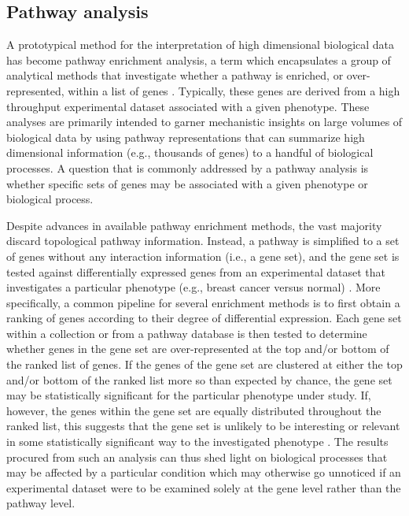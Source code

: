 \subsection{Pathway analysis}

A prototypical method for the interpretation of high dimensional biological data has become pathway enrichment analysis, a term which encapsulates a group of analytical methods that investigate whether a pathway is enriched, or over-represented, within a list of genes \parencite{reimand2019}. Typically, these genes are derived from a high throughput experimental dataset associated with a given phenotype. These analyses are primarily intended to garner mechanistic insights on large volumes of biological data by using pathway representations that can summarize high dimensional information (e.g., thousands of genes) to a handful of biological processes. A question that is commonly addressed by a pathway analysis is whether specific sets of genes may be associated with a given phenotype or biological process. 

Despite advances in available pathway enrichment methods, the vast majority discard topological pathway information. Instead, a pathway is simplified to a set of genes without any interaction information (i.e., a gene set), and the gene set is tested against differentially expressed genes from an experimental dataset that investigates a particular phenotype (e.g., breast cancer versus normal) \parencite{maleki2020}. More specifically, a common pipeline for several enrichment methods is to first obtain a ranking of genes according to their degree of differential expression. Each gene set within a collection or from a pathway database is then tested to determine whether genes in the gene set are over-represented at the top and/or bottom of the ranked list of genes. If the genes of the gene set are clustered at either the top and/or bottom of the ranked list more so than expected by chance, the gene set may be statistically significant for the particular phenotype under study. If, however, the genes within the gene set are equally distributed throughout the ranked list, this suggests that the gene set is unlikely to be interesting or relevant in some statistically significant way to the investigated phenotype \parencite{subramanian2005,hung2012}. The results procured from such an analysis can thus shed light on biological processes that may be affected by a particular condition which may otherwise go unnoticed if an experimental dataset were to be examined solely at the gene level rather than the pathway level. 

